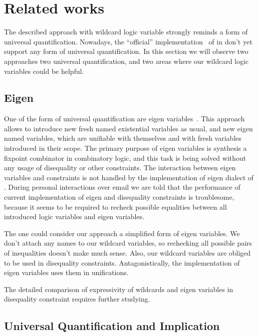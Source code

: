 

\section{Related works}
\label{sec:related}

The described approach with wildcard logic variable
strongly reminds a form of universal quantification. 
Nowadays, the ``official'' implementation~\cite{fasterMK} of \miniKanren{} in \Scheme{} don't yet support any form of universal quantification. In this section we will observe two approaches two universal quantification, and two areas where our wildcard logic variables could be helpful.

\subsection{Eigen}

One of the form of universal quantification are eigen variables~\cite{eigen}. This approach allows to introduce new fresh named existential variables as usual, and new eigen named variables, which are unifiable with themselves and with fresh variables introduced in their scope. The primary purpose of eigen variables is synthesis a fixpoint combinator in combinatory logic, and this task is being solved without any usage of disequality or other constraints. The interaction between eigen variables and constraints is not handled by the implementation of eigen dialect of \miniKanren{}. During personal interactions over email we are told that the performance of current implementation of eigen and disequality constraints is troublesome, because it seems to be required to recheck possible equalities between all introduced logic variables and eigen variables. 

The one could consider our approach a simplified form of eigen variables. We don't attach any names to our wildcard variables, so rechecking all possible pairs of inequalities doesn't make much sense. Also, our wildcard variables are obliged to be used in disequality constraints. Antagonistically, the implementation of eigen variables uses them in unifications. 

The detailed comparison of expressivity of wildcards and eigen variables in disequality constraint requires further studying. 
  
\subsection{Universal Quantification and Implication}

